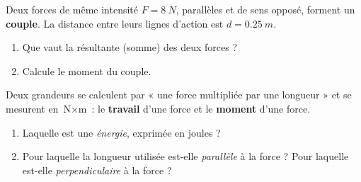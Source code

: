 \documentclass[11pt,a4paper]{article}
\begin{document}
\begin{exo}
Deux forces de même intensité $F=\qty{8}{N}$, parallèles et de sens opposé, forment un \textbf{couple}.
La distance entre leurs lignes d'action est $d=\qty{0.25}{m}$.
\begin{enumerate}[label=\alph*)]
  \item Que vaut la résultante (somme) des deux forces ?
  \item Calcule le moment du couple.
\end{enumerate}
\end{exo}

\begin{exo}
Deux grandeurs se calculent par « une force multipliée par une longueur » et se mesurent en
$\si{\newton}\times\si{\metre}$ : le \textbf{travail} d'une force et le \textbf{moment} d'une force.
\begin{enumerate}[label=\alph*)]
  \item Laquelle est une \emph{énergie}, exprimée en joules ?
  \item Pour laquelle la longueur utilisée est-elle \emph{parallèle} à la force ? Pour laquelle est-elle
        \emph{perpendiculaire} à la force ?
\end{enumerate}
\end{exo}
\end{document}
